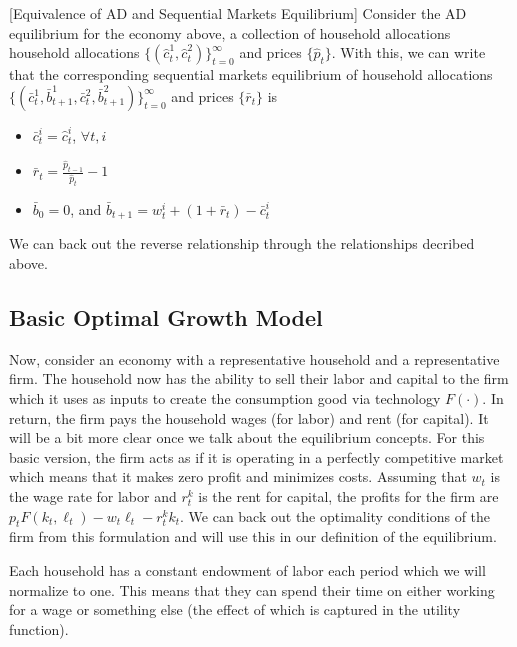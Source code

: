\documentclass[11pt,english]{article}
\begin{document}
\begin{proposition}{[Equivalence of AD and Sequential Markets Equilibrium]} Consider the AD equilibrium for the economy above, a collection of household allocations household allocations $\{( \hat{c}_t^1,\hat{c}_t^2)\}_{t=0}^\infty$ and prices $\{\hat{p}_t\}$. With this, we can write that the corresponding sequential markets equilibrium of household allocations $\{( \bar{c}_t^1, \bar{b}_{t+1}^1,\bar{c}_t^2, \bar{b}_{t+1}^2)\}_{t=0}^\infty$ and prices $\{\bar{r}_t\}$ is
\begin{itemize}
\item $\bar{c}_t^i = \hat{c}_t^i$, $\forall t,i$
\item $\bar{r}_t = \frac{\hat{p}_{t-1}}{\hat{p}_t} - 1$
\item $\bar{b}_0 = 0$, and $\bar{b}_{t+1} = w_t^i + (1 + \bar{r}_t) - \bar{c}_t^i$
\end{itemize} We can back out the reverse relationship through the relationships decribed above.
\end{proposition}

\subsection{Basic Optimal Growth Model}
Now, consider an economy with a representative household and a representative firm. The household now has the ability to sell their labor and capital to the firm which it uses as inputs to create the consumption good via technology $F(\cdot)$. In return, the firm pays the household wages (for labor) and rent (for capital). It will be a bit more clear once we talk about the equilibrium concepts. For this basic version, the firm acts as if it is operating in a perfectly competitive market which means that it makes zero profit and minimizes costs. Assuming that $w_t$ is the wage rate for labor and $r_t^k$ is the rent for capital, the profits for the firm are $p_tF(k_t, \ell_t) - w_t\ell_t - r_t^kk_t$. We can back out the optimality conditions of the firm from this formulation and will use this in our definition of the equilibrium. 

Each household has a constant endowment of labor each period which we will normalize to one. This means that they can spend their time on either working for a wage or something else (the effect of which is captured in the utility function).
\end{document}
